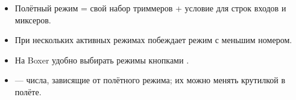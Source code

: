 \begin{summary}
\begin{itemize}
  \item Полётный режим = свой набор триммеров + условие для строк входов и миксеров.
  \item При нескольких активных режимах побеждает режим с меньшим номером.
  \item На Boxer удобно выбирать режимы кнопками .
  \item {} --- числа, зависящие от полётного режима; их можно менять крутилкой в полёте.
\end{itemize}
\end{summary}
